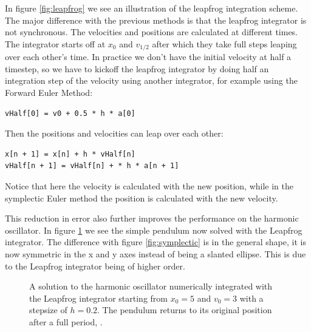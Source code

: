 \documentclass[a4paper]{article}
\begin{document}
In figure \ref{fig:leapfrog} we see an illustration of the leapfrog integration scheme. The major
difference with the previous methods is that the leapfrog integrator is not synchronous. The
velocities and positions are calculated at different times. The integrator starts off at $x_{0}$ and
$v_{1/2}$ after which they take full steps leaping over each other's time. In practice we don't have
the initial velocity at half a timestep, so we have to kickoff the leapfrog integrator by doing half
an integration step of the velocity using another integrator, for example using the Forward Euler
Method:
\begin{verbatim}
vHalf[0] = v0 + 0.5 * h * a[0]
\end{verbatim}
Then the positions and velocities can leap over each other:
\begin{verbatim}
x[n + 1] = x[n] + h * vHalf[n]
vHalf[n + 1] = vHalf[n] + * h * a[n + 1]
\end{verbatim}
Notice that here the velocity is calculated with the new position, while in the symplectic Euler
method the position is calculated with the new velocity.

This reduction in error also further improves the performance on the harmonic oscillator. In figure
\ref{fig:leap} we see the simple pendulum now solved with the Leapfrog integrator. The difference
with figure \ref{fig:symplectic} is in the general shape, it is now symmetric in the x and y axes
instead of being a slanted ellipse. This is due to the Leapfrog integrator being of higher order.

\begin{figure}
\caption{A solution to the harmonic oscillator numerically integrated with the Leapfrog integrator
  starting from $x_{0}=5$ and $v_{0}=3$ with a stepsize of $h=0.2$. The pendulum returns to its
  original position after a full period, .}
\label{fig:leap}
\end{figure}
\end{document}
